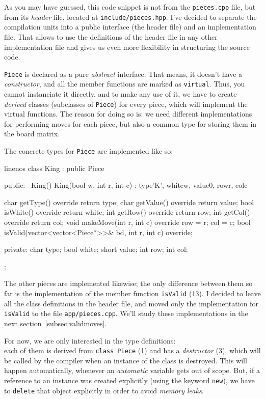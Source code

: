 As you may have guessed, this code snippet is not from the \texttt{pieces.cpp} file, but from its
\emph{header} file, located at \texttt{include/pieces.hpp}.
I've decided to separate the compilation units into a public interface (the header file) and
an implementation file.
That allows to use the definitions of the header file in any other implementation file and
gives us even more flexibility in structuring the source code.

\texttt{Piece} is declared as a pure \emph{abstract} interface.
That means, it doesn't have a \emph{constructor}, and all the member functions are marked
as \texttt{virtual}.
Thus, you cannot instanciate it directly, and to make any use of it, we have to create
\emph{derived} classes (subclasses of \texttt{Piece}) for every piece, which will
implement the virtual functions.
The reason for doing so is: we need different implementations for performing moves for
each piece, but also a common type for storing them in the board matrix. 

The concrete types for \texttt{Piece} are implemented like so:

\begin{cpp*}{linenos}
class King : public Piece {
public:
  ~King() {}
  King(bool w, int r, int c) :
    type{'K'}, white{w}, value{0}, row{r}, col{c} {}

  char getType() override { return type; }
  char getValue() override { return value; }
  bool isWhite() override { return white; }
  int getRow() override { return row; }
  int getCol() override { return col; }
  void makeMove(int r, int c) override { row = r; col = c; }
  bool isValid(vector<vector<Piece*>>& bd, int r, int c) override;

private:
  char type;
  bool white;
  short value;
  int row;
  int col;
};
\end{cpp*}

The other pieces are implemented likewise; the only difference between them so far is the
implementation of the member function \texttt{isValid} (13).
I decided to leave all the class definitions in the header file, and moved only the
implementation for \texttt{isValid} to the file \texttt{app/pieces.cpp}.
We'll study these implementations in the next section~\ref{subsec:validmoves}.

For now, we are only interested in the type definitions:\\
each of them is derived from \texttt{class Piece} (1) and has a \emph{destructor} (3),
which will be called by the compiler when an instance of the class is destroyed.
This will happen automatically, whenever an \emph{automatic} variable gets out of scope.
But, if a reference to an instance was created explicitly (using the keyword \texttt{new}),
we have to \texttt{delete} that object explicitly in order to avoid \emph{memory leaks}.

